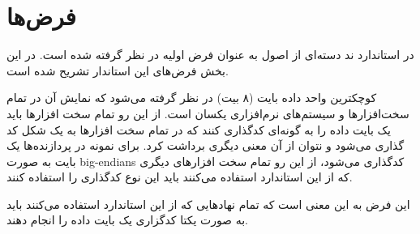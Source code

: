 \section{فرض‌ها}

در استاندارد ند دسته‌ای از اصول به عنوان فرض اولیه در نظر گرفته شده است. در این
بخش فرض‌های این استاندار تشریح شده است.

کوچکترین واحد داده بایت (۸ بیت) در نظر گرفته می‌شود که نمایش آن در تمام
سخت‌افزارها و سیستم‌های نرم‌افزاری یکسان است.
از این رو تمام سخت افزارها باید یک بایت داده را به گونه‌ای کدگذاری کنند که در
تمام سخت افزارها به یک شکل کد گذاری می‌شود و نتوان از آن معنی دیگری برداشت کرد.
برای نمونه در پردازنده‌ها یک بایت به صورت \glspl{big-endian} کدگذاری می‌شود، از
این رو تمام سخت افزارهای دیگری که از این استاندارد استفاده می‌کنند باید این نوع
کدگذاری را استفاده کنند.

\begin{note}
این فرض به این معنی است که تمام نهادهایی که از این استاندارد استفاده می‌کنند
باید به صورت یکتا کدگزاری یک بایت داده را انجام دهند.
\end{note}

